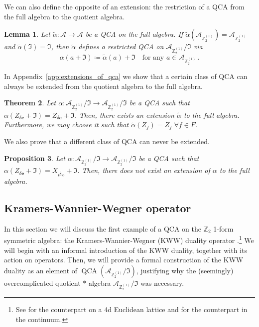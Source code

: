 \documentclass[aps,twocolumn,prx,floatfix,preprintnumbers, nofootinbib,10pt]{revtex4-2}
\numberwithin{equation}{section}
\newtheorem{theorem}{Theorem}[section]
\newtheorem{proposition}[theorem]{Proposition}
\newtheorem{lemma}[theorem]{Lemma}
\theoremstyle{definition}
\theoremstyle{remark}
\theoremstyle{claim}
\newcommand{\be}{\begin{equation}}
\newcommand{\ee}{\end{equation}}
\newcommand{\Z}{{\mathbb Z}}
\newcommand{\mc}[1]{\mathcal{#1}}
\begin{document}
We can also define the opposite of an extension: the restriction of a QCA from the full algebra to the quotient algebra.

\begin{lemma}
 Let $\tilde{\alpha} : \mc{A} \rightarrow \mc{A}$ be a QCA on the full algebra. If $\tilde{\alpha}(\mc{A}_{\Z_2^{(1)}}) = \mc{A}_{\Z_2^{(1)}}$ and $\tilde{\alpha}(\mathfrak{I}) = \mathfrak{I}$, then $\tilde{\alpha}$ defines a restricted QCA on $\mc{A}_{\Z_2^{(1)}} / \mathfrak{I}$ via
 \be
 \alpha(a + \mathfrak{I}) \coloneqq \tilde{\alpha}(a) + \mathfrak{I} \quad \text{for any } a \in \mc{A}_{\Z_2^{(1)}} \,.
 \ee
\end{lemma}

In Appendix~\ref{app:extensions_of_qca} we show that a certain class of QCA can always be extended from the quotient algebra to the full algebra.

\begin{theorem}\label{thm:QCA_extendability}
 Let $\alpha : \mc{A}_{\Z_2^{(1)}} / \mathfrak{I} \rightarrow \mc{A}_{\Z_2^{(1)}} / \mathfrak{I}$ be a QCA such that $\alpha(Z_{\delta \bm{e}} + \mathfrak{I}) = Z_{\delta \bm{e}} + \mathfrak{I}$. Then, there exists an extension $\tilde{\alpha}$ to the full algebra. Furthermore, we may choose it such that $\tilde{\alpha}(Z_f) = Z_f \; \forall f \in F$.
\end{theorem}

We also prove that a different class of QCA can never be extended.

\begin{proposition}
 Let $\alpha : \mc{A}_{\Z_2^{(1)}} / \mathfrak{I} \rightarrow \mc{A}_{\Z_2^{(1)}} / \mathfrak{I}$ be a QCA such that $\alpha(Z_{\delta \bm{e}} + \mathfrak{I}) = X_{t^\frac{1}{2} e} + \mathfrak{I}$.
 Then, there does not exist an extension of $\alpha$ to the full algebra.
\end{proposition}

\subsection{Kramers-Wannier-Wegner operator}
\label{sec: Z2 KWW}

In this section we will discuss the first example of a QCA on the $\mathbb{Z}_2$ 1-form symmetric algebra: the Kramers-Wannier-Wegner (KWW) duality operator \cite{Gorantla:2024ocs}.\footnote{See \cite{Koide:2021zxj} for the counterpart on a 4d Euclidean lattice and \cite{Choi:2021kmx, Kaidi:2021xfk} for the counterpart in the continuum.} We will begin with an informal introduction of the KWW duality, together with its action on operators. Then, we will provide a formal construction of the KWW duality as an element of $\operatorname{QCA}(\mc{A}_{\Z_2^{(1)}} / \mathfrak{I})$, justifying why the (seemingly) overcomplicated quotient $*$-algebra $\mc{A}_{\Z_2^{(1)}} / \mathfrak{I}$ was necessary.
\end{document}
